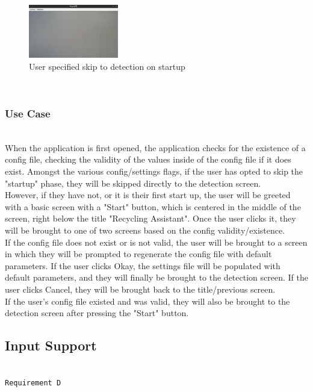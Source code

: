 \documentclass[conference]{IEEEtran}
\begin{document}
\begin{figure}[!h]
    \centering
    \includegraphics[width=0.35\textwidth]{images/nothing_detected.eps}
    \caption{User specified skip to detection on startup}
\end{figure}~\\

\subsubsection{Use Case}~\\
When the application is first opened, the application checks for the existence of a config file, checking the validity of the values inside of the config file if it does exist. Amongst the various config/settings flags, if the user has opted to skip the "startup" phase, they will be skipped directly to the detection screen.\\

However, if they have not, or it is their first start up, the user will be greeted with a basic screen with a "Start" button, which is centered in the middle of the screen, right below the title "Recycling Assistant". Once the user clicks it, they will be brought to one of two screens based on the config validity/existence. \\

If the config file does not exist or is not valid, the user will be brought to a screen in which they will be prompted to regenerate the config file with default parameters. If the user clicks Okay, the settings file will be populated with default parameters, and they will finally be brought to the detection screen. If the user clicks Cancel, they will be brought back to the title/previous screen. \\

If the user's config file existed and was valid, they will also be brought to the detection screen after pressing the "Start" button.~\\

\subsection{Input Support}~\\
\texttt{Requirement D}~\\
\end{document}
